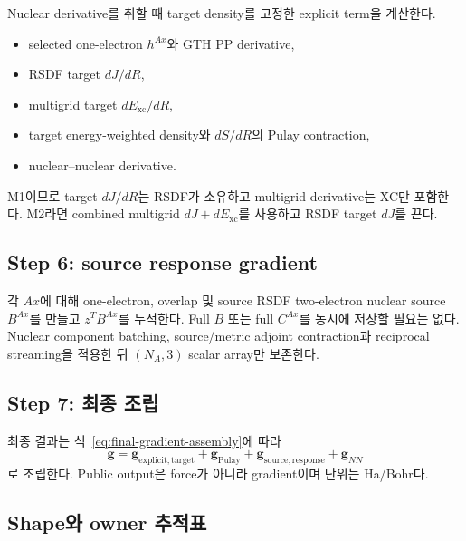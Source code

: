 Nuclear derivative를 취할 때 target density를 고정한 explicit term을 계산한다.
\begin{itemize}
  \item selected one-electron $h^{Ax}$와 GTH PP derivative,
  \item RSDF target $dJ/dR$,
  \item multigrid target $dE_{\mathrm{xc}}/dR$,
  \item target energy-weighted density와 $dS/dR$의 Pulay contraction,
  \item nuclear--nuclear derivative.
\end{itemize}
M1이므로 target $dJ/dR$는 RSDF가 소유하고 multigrid derivative는 XC만 포함한다.
M2라면 combined multigrid $dJ+dE_{\mathrm{xc}}$를 사용하고 RSDF target $dJ$를 끈다.

\subsection{Step 6: source response gradient}

각 $Ax$에 대해 one-electron, overlap 및 source RSDF two-electron nuclear source
$B^{Ax}$를 만들고 $z^TB^{Ax}$를 누적한다. Full $B$ 또는 full $C^{Ax}$를 동시에 저장할
필요는 없다. Nuclear component batching, source/metric adjoint contraction과 reciprocal
streaming을 적용한 뒤 $(N_A,3)$ scalar array만 보존한다.

\subsection{Step 7: 최종 조립}

최종 결과는 식~\eqref{eq:final-gradient-assembly}에 따라
\begin{equation}
  \mathbf g
  =\mathbf g_{\mathrm{explicit,target}}
   +\mathbf g_{\mathrm{Pulay}}
   +\mathbf g_{\mathrm{source,response}}
   +\mathbf g_{NN}
\end{equation}
로 조립한다. Public output은 force가 아니라 gradient이며 단위는 Ha/Bohr다.

\subsection{Shape와 owner 추적표}

